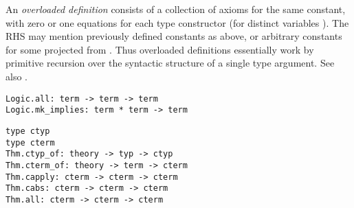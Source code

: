 \begin{isabellebody}
\begin{isamarkuptext}
  An \emph{overloaded definition} consists of a collection of axioms
  for the same constant, with zero or one equations  for each type constructor  (for
  distinct variables ).  The RHS may mention
  previously defined constants as above, or arbitrary constants  for some  projected from .  Thus overloaded definitions essentially work by
  primitive recursion over the syntactic structure of a single type
  argument.  See also \cite[\S4.3]{Haftmann-Wenzel:2006:classes}.%
\end{isamarkuptext}%
\isamarkuptrue%
%
\isadelimmlref
%
\endisadelimmlref
%
\isatagmlref
%
\begin{isamarkuptext}%
\begin{mldecls}
  \verb|Logic.all: term -> term -> term| \\
  \verb|Logic.mk_implies: term * term -> term| \\
  \end{mldecls}
  \begin{mldecls}
  \verb|type ctyp| \\
  \verb|type cterm| \\
  \verb|Thm.ctyp_of: theory -> typ -> ctyp| \\
  \verb|Thm.cterm_of: theory -> term -> cterm| \\
  \verb|Thm.capply: cterm -> cterm -> cterm| \\
  \verb|Thm.cabs: cterm -> cterm -> cterm| \\
  \verb|Thm.all: cterm -> cterm -> cterm| \\

\end{mldecls}
\end{isamarkuptext}
\end{isabellebody}
